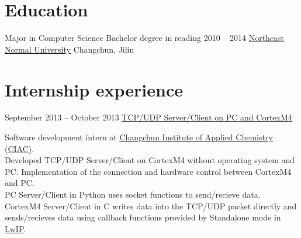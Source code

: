 \documentclass{tccv}
\begin{document}

\section{Education}

\begin{yearlist}

\item[Major in Computer Science \newline
  Bachelor degree in reading]
  {2010 -- 2014}
  {\href{http://www.nenu.edu.cn/}{Northeast Normal University}}
  {Changchun, Jilin}

\end{yearlist}

\section{Internship experience}    %

\begin{eventlist}
  
\item{September 2013 -- October 2013}
  {}
  {\href{https://github.com/YoungLeeNENU/Cortex-M4-LED-Control}{TCP/UDP Server/Client on PC and CortexM4}}

  Software development intern at \href{http://www.ciac.jl.cn/}{Changchun Institute of Applied Chemistry (CIAC)}.\\
  Developed TCP/UDP Server/Client on CortexM4 without operating system and PC. 
  Implementation of the connection and hardware control between CortexM4 and PC.\\
  PC Server/Client in Python uses socket functions to send/recieve data.\\
  CortexM4 Server/Client in C writes data into the TCP/UDP packet directly
  and sends/recieves data using callback functions provided by Standalone mode in 
  \href{http://savannah.nongnu.org/projects/lwip/}{LwIP}.
  
  
\end{eventlist}
\end{document}
